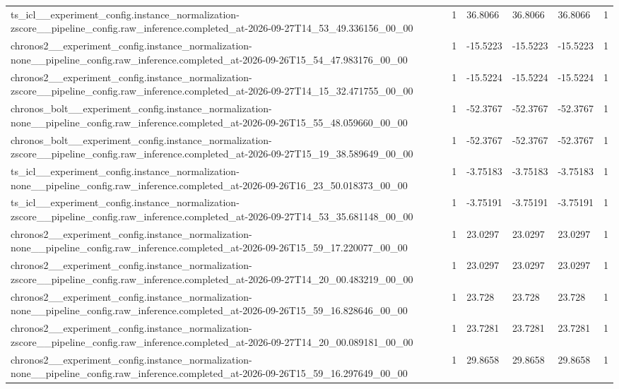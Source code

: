 \begin{tabular}{llllll}
ts\_icl\_\_experiment\_config.instance\_normalization-zscore\_\_pipeline\_config.raw\_inference.completed\_at-2026-09-27T14\_53\_49.336156\_00\_00 & 1 & 36.8066 & 36.8066 & 36.8066 & 1 \\
chronos2\_\_experiment\_config.instance\_normalization-none\_\_pipeline\_config.raw\_inference.completed\_at-2026-09-26T15\_54\_47.983176\_00\_00 & 1 & -15.5223 & -15.5223 & -15.5223 & 1 \\
chronos2\_\_experiment\_config.instance\_normalization-zscore\_\_pipeline\_config.raw\_inference.completed\_at-2026-09-27T14\_15\_32.471755\_00\_00 & 1 & -15.5224 & -15.5224 & -15.5224 & 1 \\
chronos\_bolt\_\_experiment\_config.instance\_normalization-none\_\_pipeline\_config.raw\_inference.completed\_at-2026-09-26T15\_55\_48.059660\_00\_00 & 1 & -52.3767 & -52.3767 & -52.3767 & 1 \\
chronos\_bolt\_\_experiment\_config.instance\_normalization-zscore\_\_pipeline\_config.raw\_inference.completed\_at-2026-09-27T15\_19\_38.589649\_00\_00 & 1 & -52.3767 & -52.3767 & -52.3767 & 1 \\
ts\_icl\_\_experiment\_config.instance\_normalization-none\_\_pipeline\_config.raw\_inference.completed\_at-2026-09-26T16\_23\_50.018373\_00\_00 & 1 & -3.75183 & -3.75183 & -3.75183 & 1 \\
ts\_icl\_\_experiment\_config.instance\_normalization-zscore\_\_pipeline\_config.raw\_inference.completed\_at-2026-09-27T14\_53\_35.681148\_00\_00 & 1 & -3.75191 & -3.75191 & -3.75191 & 1 \\
chronos2\_\_experiment\_config.instance\_normalization-none\_\_pipeline\_config.raw\_inference.completed\_at-2026-09-26T15\_59\_17.220077\_00\_00 & 1 & 23.0297 & 23.0297 & 23.0297 & 1 \\
chronos2\_\_experiment\_config.instance\_normalization-zscore\_\_pipeline\_config.raw\_inference.completed\_at-2026-09-27T14\_20\_00.483219\_00\_00 & 1 & 23.0297 & 23.0297 & 23.0297 & 1 \\
chronos2\_\_experiment\_config.instance\_normalization-none\_\_pipeline\_config.raw\_inference.completed\_at-2026-09-26T15\_59\_16.828646\_00\_00 & 1 & 23.728 & 23.728 & 23.728 & 1 \\
chronos2\_\_experiment\_config.instance\_normalization-zscore\_\_pipeline\_config.raw\_inference.completed\_at-2026-09-27T14\_20\_00.089181\_00\_00 & 1 & 23.7281 & 23.7281 & 23.7281 & 1 \\
chronos2\_\_experiment\_config.instance\_normalization-none\_\_pipeline\_config.raw\_inference.completed\_at-2026-09-26T15\_59\_16.297649\_00\_00 & 1 & 29.8658 & 29.8658 & 29.8658 & 1 \\

\end{tabular}
